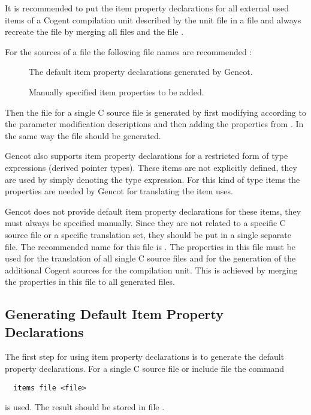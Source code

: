 It is recommended to put the item property declarations for all external used items of a Cogent compilation unit described by
the unit file  in a file  and always recreate the file  by merging all
files  and the file .

For the sources of a file  the following file names are recommended :
\begin{description}
\item[] The default item property declarations generated by Gencot.
\item[] Manually specified item properties to be added. 
\end{description}
Then the file  for a single C source file is generated by first modifying  
according to the parameter modification descriptions and then adding the properties from . In the same
way the file  should be generated.

Gencot also supports item property declarations for a restricted form of type expressions (derived pointer types). These items
are not explicitly defined, they are used by simply denoting the type expression. For this kind of type items the properties are 
needed by Gencot for translating the item uses. 

Gencot does not provide default item property declarations for these items, they must always be specified manually. Since they 
are not related to a specific C source file or a specific translation set, they should be put in a single separate file. The 
recommended name for this file is . The properties in this file must be used for the translation 
of all single C source files and for the generation of the additional Cogent sources for the compilation unit. This is 
achieved by merging the properties in this file to all generated  files.

\subsection{Generating Default Item Property Declarations}
\label{app-itemprops-default}

The first step for using item property declarations is to generate the default property declarations. For a single C source 
file or include file  the command
\begin{verbatim}
  items file <file>
\end{verbatim}
is used. The result should be stored in file .

